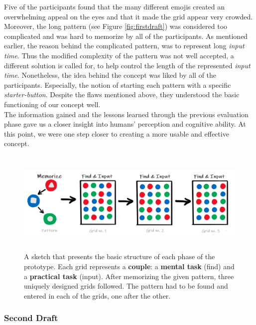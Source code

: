 Five of the participants found that the many different emojis created an overwhelming appeal on the eyes and that it made the grid appear very crowded. Moreover, the long pattern (see Figure \ref{fig:firstdraft}) was considered too complicated and was hard to memorize by all of the participants. As mentioned earlier, the reason behind the complicated pattern, was to represent long \textit{input time}. Thus the modified complexity of the pattern was not well accepted, a different solution is called for, to help control the length of the represented \textit{input time}. Nonetheless, the idea behind the concept was liked by all of the participants. Especially, the notion of starting each pattern with a specific \textit{starter-button}. Despite the flaws mentioned above, they understood the basic functioning of our concept well. \\

The information gained and the lessons learned through the previous evaluation phase gave us a closer insight into humans' perception and cognitive ability. At this point, we were one step closer to creating a more usable and effective concept.

\begin{figure}[t!]
\centering
\includegraphics[width=13cm, height=5cm]{Chapters/graphics/seconddraft.PNG}
\caption{A sketch that presents the basic structure of each phase of the prototype. Each grid represents a \textbf{couple}: a \textbf{mental task} (find) and a \textbf{practical task} (input). After memorizing the given pattern, three uniquely designed grids followed. The pattern had to be found and entered in each of the grids, one after the other.}
\label{fig:secondDraft}
\end{figure}

\subsubsection{Second Draft} \label{4.2.2.3}

